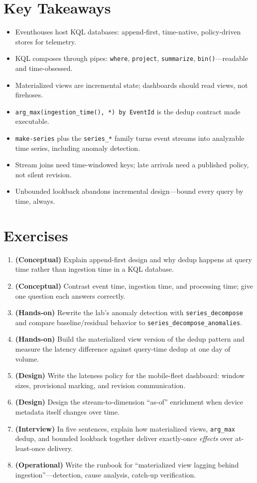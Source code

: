 \section*{Key Takeaways}
\begin{itemize}
    \item Eventhouses host KQL databases: append-first, time-native, policy-driven stores for telemetry.
    \item KQL composes through pipes: \texttt{where}, \texttt{project}, \texttt{summarize}, \texttt{bin()}---readable and time-obsessed.
    \item Materialized views are incremental state; dashboards should read views, not firehoses.
    \item \texttt{arg\_max(ingestion\_time(), *) by EventId} is the dedup contract made executable.
    \item \texttt{make-series} plus the \texttt{series\_*} family turns event streams into analyzable time series, including anomaly detection.
    \item Stream joins need time-windowed keys; late arrivals need a published policy, not silent revision.
    \item Unbounded lookback abandons incremental design---bound every query by time, always.
\end{itemize}

\section{Exercises}
\begin{enumerate}
    \item \textbf{(Conceptual)} Explain append-first design and why dedup happens at query time rather than ingestion time in a KQL database.
    \item \textbf{(Conceptual)} Contrast event time, ingestion time, and processing time; give one question each answers correctly.
    \item \textbf{(Hands-on)} Rewrite the lab's anomaly detection with \texttt{series\_decompose} and compare baseline/residual behavior to \texttt{series\_decompose\_anomalies}.
    \item \textbf{(Hands-on)} Build the materialized view version of the dedup pattern and measure the latency difference against query-time dedup at one day of volume.
    \item \textbf{(Design)} Write the lateness policy for the mobile-fleet dashboard: window sizes, provisional marking, and revision communication.
    \item \textbf{(Design)} Design the stream-to-dimension ``as-of'' enrichment when device metadata itself changes over time.
    \item \textbf{(Interview)} In five sentences, explain how materialized views, \texttt{arg\_max} dedup, and bounded lookback together deliver exactly-once \emph{effects} over at-least-once delivery.
    \item \textbf{(Operational)} Write the runbook for ``materialized view lagging behind ingestion''---detection, cause analysis, catch-up verification.
\end{enumerate}

